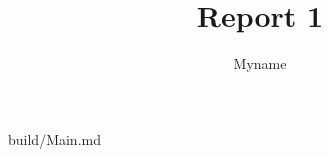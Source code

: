 \documentclass[11pt,a4j]{jarticle}
\title{Report 1}
\author{Myname}
\begin{document}
\maketitle
 {build/Main.md}
\end{document}
